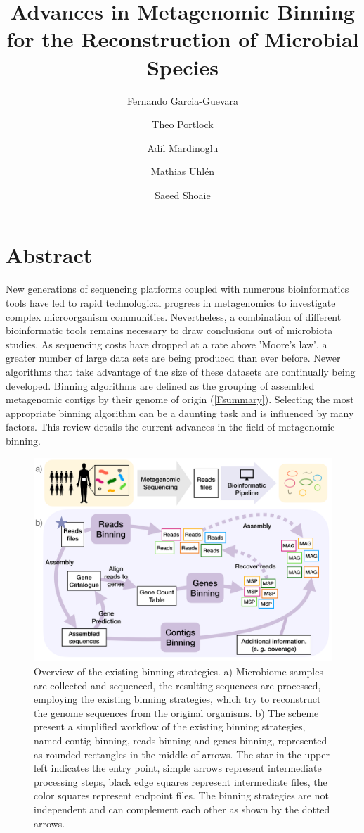 \documentclass{article}
\title{Advances in Metagenomic Binning for the Reconstruction of Microbial Species}
\author[1*]{Fernando Garcia-Guevara}
\author[1*]{Theo Portlock}
\author[1,2]{Adil Mardinoglu}
\author[1]{Mathias Uhlén}
\author[1,2]{Saeed Shoaie}
\affil[1]{Science for Life Laboratory, Royal Institute of Technology (KTH), Stockholm, Sweden.}
\affil[2]{Centre for Host Microbiome Interactions, Faculty of Dentistry, Oral \& Craniofacial Sciences, King’s College London, London, UK. }
\date{}
\begin{document}
\maketitle
\tableofcontents

\printglossaries

\section{Abstract}
New generations of sequencing platforms coupled with numerous bioinformatics tools have led to rapid technological progress in metagenomics to investigate complex microorganism communities.
Nevertheless, a combination of different bioinformatic tools remains necessary to draw conclusions out of microbiota studies.
As sequencing costs have dropped at a rate above 'Moore's law', a greater number of large data sets are being produced than ever before.
Newer algorithms that take advantage of the size of these datasets are continually being developed.
Binning algorithms are defined as the grouping of assembled metagenomic contigs by their genome of origin (\autoref{Fsummary}).
Selecting the most appropriate binning algorithm can be a daunting task and is influenced by many factors.
This review details the current advances in the field of metagenomic binning.

\begin{figure}
\centering
\includegraphics[scale=0.265]{figures/v003.pdf}
\caption["Overview of the existing binning strategies."]{
	Overview of the existing binning strategies. a) Microbiome samples are collected and sequenced, the resulting sequences are processed, employing the existing binning strategies, which try to reconstruct the genome sequences from the original organisms. b) The scheme present a simplified workflow of the existing binning strategies, named contig-binning, reads-binning and genes-binning, represented as rounded rectangles in the middle of arrows. The star in the upper left indicates the entry point, simple arrows represent intermediate processing steps, black edge squares represent intermediate files, the color squares represent endpoint files. The binning strategies are not independent and can complement each other as shown by the dotted arrows.}
\label{Fsummary}
\end{figure}
\end{document}
